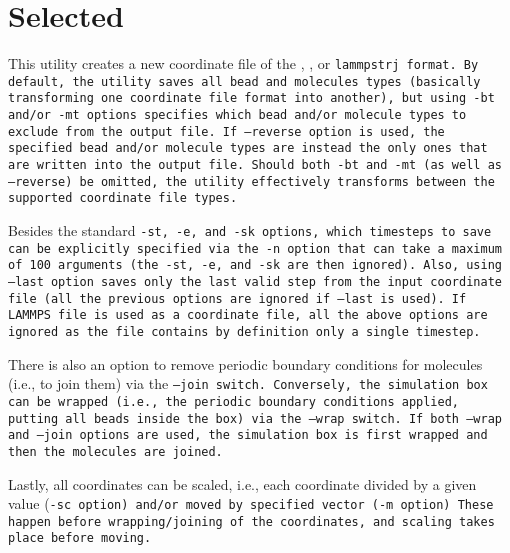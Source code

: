 \section{Selected} \label{sec:Selected}

This utility creates a new coordinate file of the \xyz, \vtcf, or \tt{lammpstrj}
format. By default, the utility saves all bead and molecules types (basically
transforming one coordinate file format into another), but using \tt{-bt} and/or
\tt{-mt} options specifies which bead and/or molecule types to exclude from the
output file. If \tt{--reverse} option is used, the specified bead and/or
molecule types are instead the only ones that are written into the output file.
Should both \tt{-bt} and \tt{-mt} (as well as \tt{--reverse}) be omitted, the
utility effectively transforms between the supported coordinate file types.

Besides the standard \tt{-st}, \tt{-e}, and \tt{-sk} options, which timesteps to
save can be explicitly specified via the \tt{-n} option that can take a maximum
of 100 arguments (the \tt{-st}, \tt{-e}, and \tt{-sk} are then ignored). Also,
using \tt{--last} option saves only the last valid step from the input
coordinate file (all the previous options are ignored if \tt{--last} is used).
If LAMMPS \data file is used as a coordinate file, all the above options are
ignored as the \data file contains by definition only a single timestep.

There is also an option to remove periodic boundary conditions for molecules
(i.e., to join them) via the \tt{--join} switch. Conversely, the simulation box
can be wrapped (i.e., the periodic boundary conditions applied, putting all
beads inside the box) via the \tt{--wrap} switch. If both \tt{--wrap} and
\tt{--join} options are used, the simulation box is first wrapped and then the
molecules are joined.

Lastly, all coordinates can be scaled, i.e., each coordinate divided by a given
value (\tt{-sc} option) and/or moved by specified vector (\tt{-m} option)
These happen before wrapping/joining of the coordinates, and scaling takes place
before moving.

